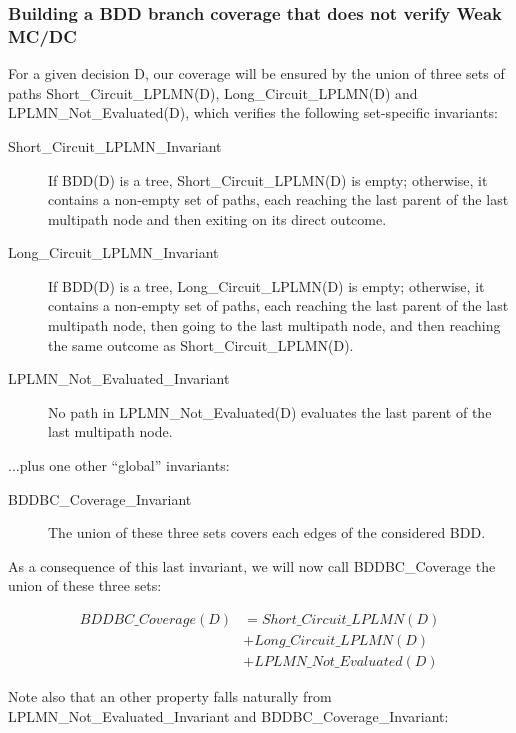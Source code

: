 \documentclass[a4paper,12pt,twoside]{article}
\begin{document}
\subsubsection{Building a BDD branch coverage that does not verify Weak MC/DC}

For a given decision D, our coverage will be ensured by the union of
three sets of paths Short\_Circuit\_LPLMN(D), Long\_Circuit\_LPLMN(D) and
LPLMN\_Not\_Evaluated(D), which verifies the following set-specific
invariants:

\begin{description}
\item[Short\_Circuit\_LPLMN\_Invariant]
  If BDD(D) is a tree, Short\_Circuit\_LPLMN(D) is empty;
  otherwise, it contains a non-empty set of paths, each reaching the
  last parent of the last multipath node and then exiting on its direct
  outcome.

\item[Long\_Circuit\_LPLMN\_Invariant]
  If BDD(D) is a tree, Long\_Circuit\_LPLMN(D) is empty;
  otherwise, it contains a non-empty set of paths, each reaching the last
  parent of the last multipath node, then going to the last multipath node, and
  then reaching the same outcome as Short\_Circuit\_LPLMN(D).

\item[LPLMN\_Not\_Evaluated\_Invariant]
  No path in LPLMN\_Not\_Evaluated(D) evaluates the last parent of the last
  multipath node.
\end{description}

...plus one other ``global'' invariants:

\begin{description}
\item[BDDBC\_Coverage\_Invariant]
 The union of these three sets covers each edges of the considered
 BDD.
\end{description}

As a consequence of this last invariant, we will now call
BDDBC\_Coverage the union of these three sets:

\begin{align*}
  BDDBC\_Coverage(D) & = Short\_Circuit\_LPLMN(D)\\
                     & + Long\_Circuit\_LPLMN(D)\\
                     & + LPLMN\_Not\_Evaluated(D)
\end{align*}

Note also that an other property falls naturally from
LPLMN\_Not\_Evaluated\_Invariant and BDDBC\_Coverage\_Invariant:
\end{document}
